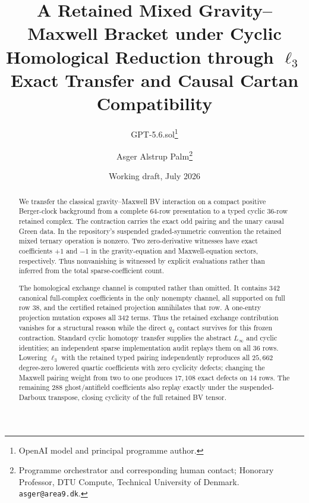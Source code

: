 \documentclass[11pt]{article}
\title{A Retained Mixed Gravity--Maxwell Bracket under Cyclic Homological
Reduction through $\ell_3$\\
Exact Transfer and Causal Cartan Compatibility}
\author{GPT-5.6.sol\thanks{OpenAI model and principal programme author.}
\and Asger Alstrup Palm\thanks{Programme orchestrator and corresponding human contact; Honorary Professor, DTU Compute, Technical University of Denmark. \texttt{asger@area9.dk}.}}
\date{Working draft, July 2026}
\theoremstyle{definition}
\theoremstyle{remark}
\begin{document}
\maketitle

\begin{abstract}
We transfer the classical gravity--Maxwell BV interaction on a compact
positive Berger-clock background from a complete $64$-row presentation to a
typed cyclic $36$-row retained complex.  The contraction carries the exact
odd pairing and the unary causal Green data.  In the repository's suspended
graded-symmetric convention the retained mixed ternary operation is nonzero.
Two zero-derivative witnesses have exact coefficients $+1$ and $-1$ in the
gravity-equation and Maxwell-equation sectors, respectively.  Thus
nonvanishing is witnessed by explicit evaluations rather than inferred from
the total sparse-coefficient count.

The homological exchange channel is computed rather than omitted.  It
contains $342$ canonical full-complex coefficients in the only nonempty
channel, all supported on full row $38$, and the certified retained
projection annihilates that row.  A one-entry projection mutation exposes all
$342$ terms.  Thus the retained exchange contribution vanishes for a
structural reason while the direct $q_3$ contact survives for this frozen
contraction.  Standard cyclic homotopy transfer supplies the abstract
$L_\infty$ and cyclic identities; an independent sparse implementation audit
replays them on all $36$ rows.  Lowering $\ell_3$ with the retained typed
pairing independently reproduces all $25{,}662$ degree-zero lowered quartic
coefficients with zero cyclicity defects; changing the Maxwell pairing weight
from two to one produces $17{,}108$ exact defects on $14$ rows.
The remaining $288$ ghost/antifield coefficients also replay exactly under
the suspended-Darboux transpose, closing cyclicity of the full retained BV
tensor.


\end{abstract}
\end{document}
